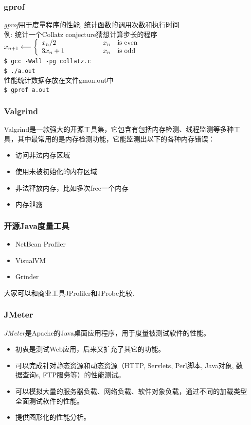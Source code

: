 \documentclass[compress]{beamer}
\begin{document}
\begin{frame}[fragile]
\frametitle{gprof}

\emph{gprof}用于度量程序的性能, 统计函数的调用次数和执行时间\\
例: 统计一个Collatz conjecture猜想计算步长的程序\\[1ex]
\begin{math}
x_{n+1}\longleftarrow\left\{
\begin{array}{l@{\hspace{2cm}}l}
x_n/2 & x_n \quad\mbox{is even} \\
3x_n + 1 & x_n \quad\mbox{is odd}
\end{array}\right.
\end{math}\\

\verb~$ gcc -Wall -pg collatz.c~\\
\verb~$ ./a.out~ \\
性能统计数据存放在文件gmon.out中\\
\verb~$ gprof a.out~\\

\end{frame}

\begin{frame}
	\frametitle{Valgrind}
Valgrind是一款强大的开源工具集，它包含有包括内存检测、线程监测等多种工具，其中最常用的是内存检测功能，它能监测出以下的各种内存错误：
\begin{itemize}
	\item 访问非法内存区域
	\item  使用未被初始化的内存区域
	\item  非法释放内存，比如多次free一个内存
	\item  内存泄露
\end{itemize}
\end{frame}

\begin{frame}
	\frametitle{开源Java度量工具}
	\begin{itemize}
		\item NetBean Profiler
		\item VisualVM
		\item Grinder
	\end{itemize}
	大家可以和商业工具JProfiler和JProbe比较.
\end{frame}


\begin{frame}
	\frametitle{JMeter}
	\emph{JMeter}是Apache的Java桌面应用程序，用于度量被测试软件的性能。
	\begin{itemize}
		\item 初衷是测试Web应用，后来又扩充了其它的功能。
		\item 可以完成针对静态资源和动态资源（HTTP, Servlets, Perl脚本, Java对象, 数据查询s, FTP服务等）的性能测试。
		\item 可以模拟大量的服务器负载、网络负载、软件对象负载，通过不同的加载类型全面测试软件的性能。
		\item 提供图形化的性能分析。 
	\end{itemize}
\end{frame}
\end{document}
